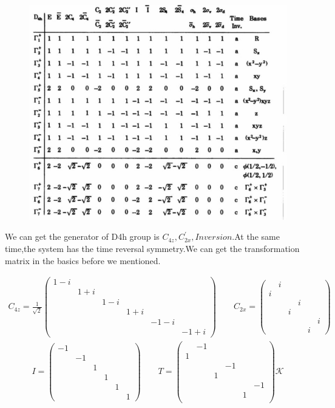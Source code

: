 \documentclass[5pt]{article}
\begin{document}
\begin{figure}[H]
	\centering
	\includegraphics[scale=0.8]{figure/1}
	\caption{}
	\label{}
\end{figure}
We can get the generator of D4h group is $C_{4z},C_{2x}^{'},Inversion$.At the same time,the system has the time reversal symmetry.We can get the transformation matrix in the basics before we mentioned.
\begin{normalsize}
\begin{align}
	C_{4z}=
	\frac{1}{\sqrt{2}}
	\begin{pmatrix}
		1-i&&&&&\\
		&1+i&&&&\\
		&&1-i&&&\\
		&&&1+i&&\\
		&&&&-1-i&\\
		&&&&&-1+i
	\end{pmatrix}
\qquad
C_{2x}=\begin{pmatrix}
	&i&&&&\\
	i&&&&&\\
	&&&i&&\\
	&&i&&&\\
	&&&&&i\\
	&&&&i&
\end{pmatrix}
\end{align}
\begin{align}
	I=\begin{pmatrix}
		-1&&&&&\\
		&-1&&&&\\
		&&1&&&\\
		&&&1&&\\
		&&&&1&\\
		&&&&&1
	\end{pmatrix}
\qquad
T=
\begin{pmatrix}
&-1&&&&\\
1&&&&&\\
&&&-1&&\\
&&1&&&\\
&&&&&-1\\
&&&&1&\\	
\end{pmatrix}
\mathcal{K}
\end{align}
\end{normalsize}
\end{document}
